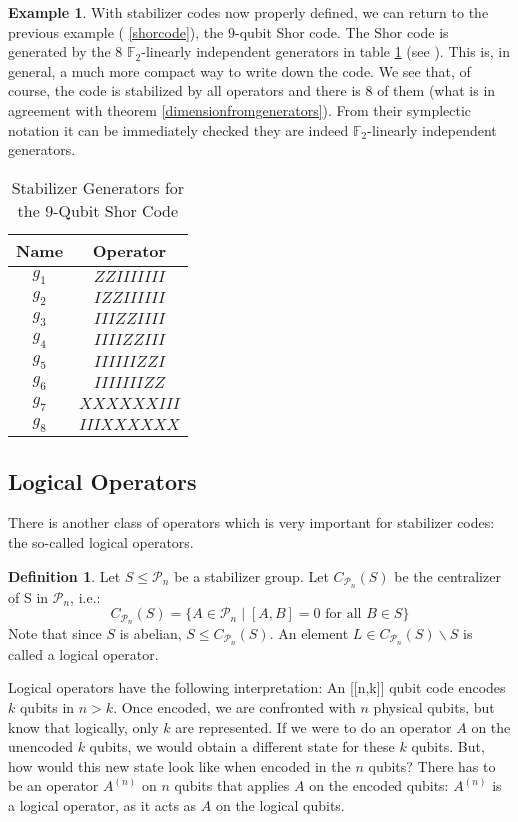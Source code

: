 \documentclass{article}
\def\P{\mathcal{P}}
\def\F{\mathbb{F}}
\theoremstyle{definition}
\newtheorem{ex}[Satz]{Example}
\newtheorem{defn}[Satz]{Definition}
\begin{document}
\begin{ex}\label{shorstab}
With stabilizer codes now properly defined, we can return to the previous example ( \ref{shorcode}), the 9-qubit Shor code. The Shor code is generated by the 8 $\F_2$-linearly independent generators in table  \ref{shorgenerators} (see \cite{NC}). This is, in general, a much more compact way to write down the code. We see that, of course, the code is stabilized by all operators and there is 8 of them (what is in agreement with theorem  \ref{dimensionfromgenerators}). From their symplectic notation it can be immediately checked they are indeed $\F_2$-linearly independent generators.
\begin{table}[h]
\centering 
\begin{tabular}{|c|c|}
\hline
Name & Operator \\ \hline
$g_1$ & $ZZIIIIIII$ \\ \hline
$g_2$ & $IZZIIIIII$ \\ \hline
$g_3$ & $IIIZZIIII$ \\ \hline
$g_4$ & $IIIIZZIII$ \\ \hline
$g_5$ & $IIIIIIZZI$ \\ \hline
$g_6$ & $IIIIIIIZZ$ \\ \hline
$g_7$ & $XXXXXXIII$ \\ \hline
$g_8$ & $IIIXXXXXX$ \\ \hline
\end{tabular}
\caption{ Stabilizer Generators for the 9-Qubit Shor Code}
\label{shorgenerators}
\end{table}
\end{ex}

\subsection{Logical Operators}
There is another class of operators which is very important for stabilizer codes: the so-called logical operators. 

\begin{defn}
Let $S \leq \P_n$ be a stabilizer group. Let $C_{\P_n}(S)$ be the centralizer of S in $\P_n$,  i.e.:
\[ C_{\P_n}(S) = \{ A \in \P_n \mid [A,B] = 0 \text{ for all } B \in S \} \]
Note that since $S$ is abelian, $S \leq C_{\P_n}(S)$. An element $L \in C_{\P_n}(S) \backslash S$ is called a logical operator.
\end{defn}

Logical operators have the following interpretation:
An [[n,k]] qubit code encodes $k$ qubits in $n > k$. Once encoded, we are confronted with $n$ physical qubits, but know that logically, only $k$ are represented. If we were to do an operator $A$ on the unencoded $k$ qubits, 
we would obtain a different state for these $k$ qubits. But, how would this new state look like when encoded in the $n$ qubits? There has to be an operator $A^{(n)}$ on $n$ qubits that applies $A$ on the encoded qubits: $A^{(n)}$ is a logical
operator, as it acts as $A$ on the logical qubits.
\end{document}
